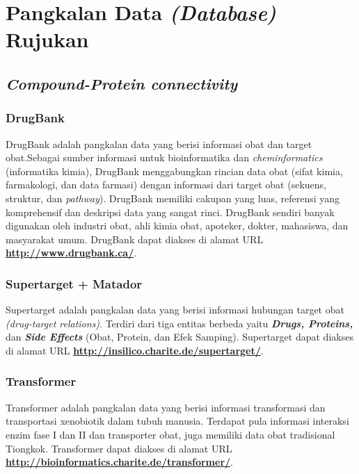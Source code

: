 \chapter{Pangkalan Data \emph{(Database)} Rujukan}

\section{\emph{Compound-Protein connectivity}}
	\subsection{DrugBank} \label{drugbank}
	DrugBank adalah pangkalan data yang berisi informasi obat dan target obat.Sebagai sumber informasi untuk bioinformatika dan \emph{cheminformatics} (informatika kimia), DrugBank menggabungkan rincian data obat (sifat kimia, farmakologi, dan data farmasi) dengan informasi dari target obat (sekuens, struktur, dan \emph{pathway}). DrugBank memiliki cakupan yang luas, referensi yang komprehensif dan deskripsi data yang sangat rinci. DrugBank sendiri banyak digunakan oleh industri obat, ahli kimia obat, apoteker, dokter, mahasiswa, dan masyarakat umum. DrugBank dapat diakses di alamat URL \href{http://www.drugbank.ca/}{\textbf{http://www.drugbank.ca/}}.

	\subsection{Supertarget + Matador} \label{supertarget}
	Supertarget adalah pangkalan data yang berisi informasi hubungan target obat \emph{(drug-target relations)}. Terdiri dari tiga entitas berbeda yaitu \textbf{\emph{Drugs, Proteins,}} dan \textbf{\emph{Side Effects}} (Obat, Protein, dan Efek Samping). Supertarget dapat diakses di alamat URL \href{http://insilico.charite.de/supertarget/}{\textbf{http://insilico.charite.de/supertarget/}}.

	\subsection{Transformer} \label{transformer}
	Transformer adalah pangkalan data yang berisi informasi transformasi dan transportasi xenobiotik dalam tubuh manusia. Terdapat pula informasi interaksi enzim fase I dan II dan transporter obat, juga memiliki data obat tradisional Tiongkok. Transformer dapat diakses di alamat URL \href{http://bioinformatics.charite.de/transformer/}{\textbf{http://bioinformatics.charite.de/transformer/}}.

